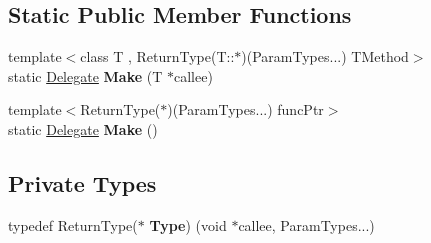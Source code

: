 \subsection*{Static Public Member Functions}
\begin{DoxyCompactItemize}
\item 
{\footnotesize template$<$class T , Return\+Type(\+T\+::$\ast$)(\+Param\+Types...) T\+Method$>$ }\\static \hyperlink{class_ensum_1_1_utils_1_1_delegate}{Delegate} {\bfseries Make} (T $\ast$callee)\hypertarget{class_ensum_1_1_utils_1_1_delegate_3_01_return_type_07_param_types_8_8_8_08_4_a55c46806e8372852550f6ae7326140fc}{}\label{class_ensum_1_1_utils_1_1_delegate_3_01_return_type_07_param_types_8_8_8_08_4_a55c46806e8372852550f6ae7326140fc}

\item 
{\footnotesize template$<$Return\+Type($\ast$)(\+Param\+Types...) func\+Ptr$>$ }\\static \hyperlink{class_ensum_1_1_utils_1_1_delegate}{Delegate} {\bfseries Make} ()\hypertarget{class_ensum_1_1_utils_1_1_delegate_3_01_return_type_07_param_types_8_8_8_08_4_a9c39a6686ddf93ac1255d9f482844a52}{}\label{class_ensum_1_1_utils_1_1_delegate_3_01_return_type_07_param_types_8_8_8_08_4_a9c39a6686ddf93ac1255d9f482844a52}

\end{DoxyCompactItemize}
\subsection*{Private Types}
\begin{DoxyCompactItemize}
\item 
typedef Return\+Type($\ast$ {\bfseries Type}) (void $\ast$callee, Param\+Types...)\hypertarget{class_ensum_1_1_utils_1_1_delegate_3_01_return_type_07_param_types_8_8_8_08_4_a2a7c0af5bb292262a83fb30e7126eaf1}{}\label{class_ensum_1_1_utils_1_1_delegate_3_01_return_type_07_param_types_8_8_8_08_4_a2a7c0af5bb292262a83fb30e7126eaf1}

\end{DoxyCompactItemize}
